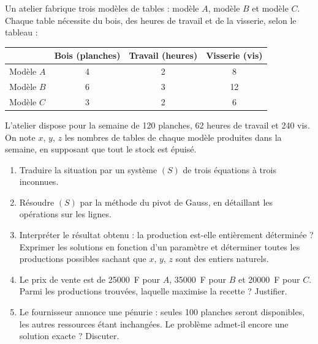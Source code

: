 \documentclass[11pt]{article}
\begin{document}
\begin{exercice}
Un atelier fabrique trois modèles de tables : modèle $A$, modèle $B$ et modèle $C$. Chaque table nécessite du bois, des heures de travail et de la visserie, selon le tableau :

\begin{center}
\begin{tabular}{|l|c|c|c|}
\hline
 & Bois (planches) & Travail (heures) & Visserie (vis) \\
\hline
Modèle $A$ & 4 & 2 & 8 \\
Modèle $B$ & 6 & 3 & 12 \\
Modèle $C$ & 3 & 2 & 6 \\
\hline
\end{tabular}
\end{center}

L'atelier dispose pour la semaine de 120 planches, 62 heures de travail et 240 vis. On note $x$, $y$, $z$ les nombres de tables de chaque modèle produites dans la semaine, en supposant que tout le stock est épuisé.

\begin{enumerate}
\item Traduire la situation par un système $(S)$ de trois équations à trois inconnues.
\item Résoudre $(S)$ par la méthode du pivot de Gauss, en détaillant les opérations sur les lignes.
\item Interpréter le résultat obtenu : la production est-elle entièrement déterminée ? Exprimer les solutions en fonction d'un paramètre et déterminer toutes les productions possibles sachant que $x$, $y$, $z$ sont des entiers naturels.
\item Le prix de vente est de \SI{25000}{F} pour $A$, \SI{35000}{F} pour $B$ et \SI{20000}{F} pour $C$. Parmi les productions trouvées, laquelle maximise la recette ? Justifier.
\item Le fournisseur annonce une pénurie : seules 100 planches seront disponibles, les autres ressources étant inchangées. Le problème admet-il encore une solution exacte ? Discuter.
\end{enumerate}
\end{exercice}
\end{document}
